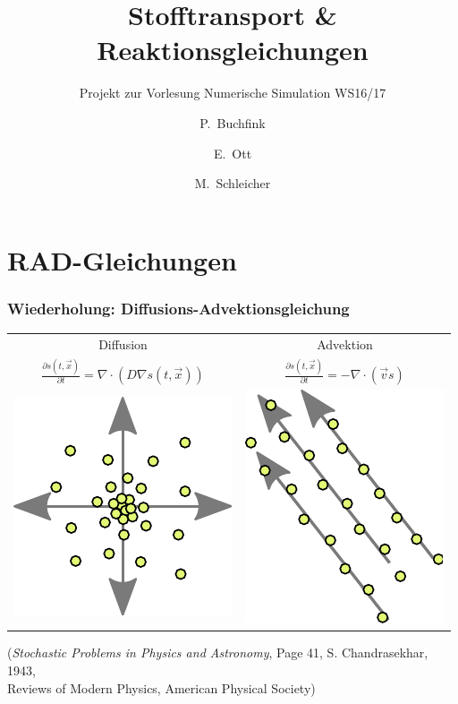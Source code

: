 \documentclass[12pt]{beamer}
\title{Stofftransport \& Reaktionsgleichungen}
\subtitle{Projekt zur Vorlesung Numerische Simulation WS16/17}
\author{P.~Buchfink \and E.~Ott \and M.~Schleicher}
\begin{document}
  \begin{frame}
    \titlepage
  \end{frame}

  \section{RAD-Gleichungen}
    \begin{frame}
    \frametitle{Wiederholung: Diffusions-Advektionsgleichung}
    \begin{center}
    \begin{tabular}{ c c }
	Diffusion & Advektion \\
	$\frac{\partial s(t,\vec{x})}{\partial t} = \nabla \cdot (D \nabla s(t,\vec{x}))$
	&
	$\frac{\partial s(t,\vec{x})}{\partial t} = - \nabla \cdot (\vec{v}s)$
	\\
      \includegraphics[scale=0.5]{Bilder/diffusion.pdf}
	&
      \includegraphics[scale=0.5,angle=-90,origin=c]{Bilder/advection.pdf}
	\\
    \end{tabular}

    \end{center}
    \hfill
    \begin{center}  
    
    {\tiny (\emph{Stochastic Problems in Physics and Astronomy}, Page 41, S. Chandrasekhar, 1943,
    \\[-0.15cm]
    Reviews of Modern Physics, American Physical Society)}
    
    \end{center}
    \end{frame}
\end{document}
